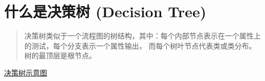 \documentclass[11pt]{article}
\date{\today}
\title{}
\begin{document}
\tableofcontents

\section{什么是决策树 (Decision Tree)}
\label{sec:org1a3f109}

\begin{quote}
决策树类似于一个流程图的树结构，其中：每个内部节点表示在一个属性上的测试，每个分支表示一个属性输出，
而每个树叶节点代表类或类分布。树的最顶层是根节点。
\end{quote}

\href{decisiontree/decisiontree\_01.jpg}{决策树示意图} 
\end{document}

